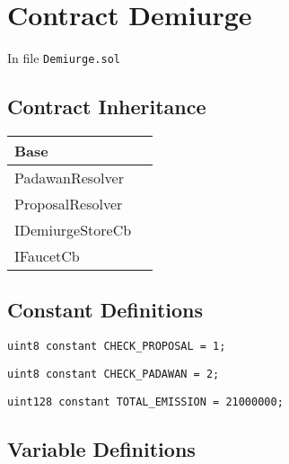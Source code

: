 
\chapter{Contract Demiurge}

\minitoc

In file {\tt Demiurge.sol}

\section{Contract Inheritance}


\noindent\begin{tabular}{|l|p{5cm}|}\hline
Base & \\\hline
PadawanResolver & \\\hline
ProposalResolver & \\\hline
IDemiurgeStoreCb & \\\hline
IFaucetCb & \\\hline
\end{tabular}


\section{Constant Definitions}


\begin{lstlisting}[firstnumber=30]
    uint8 constant CHECK_PROPOSAL = 1;
\end{lstlisting}

\begin{lstlisting}[firstnumber=31]
    uint8 constant CHECK_PADAWAN = 2;
\end{lstlisting}

\begin{lstlisting}[firstnumber=33]
    uint128 constant TOTAL_EMISSION = 21000000;
\end{lstlisting}

\section{Variable Definitions}


